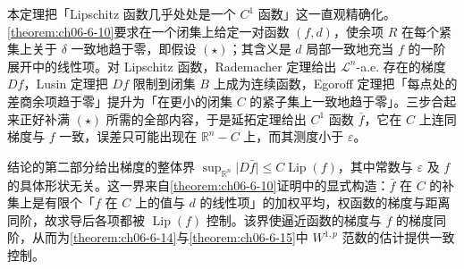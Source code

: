 \documentclass[../../main.tex]{subfiles}%
\begin{document}
\begin{remark}\label{remark:ch06-thm-6-11-动机}
本定理把「Lipschitz 函数几乎处处是一个 $C^1$ 函数」这一直观精确化。\cref{theorem:ch06-6-10}要求在一个闭集上给定一对函数 $(f,d)$，使余项 $R$ 在每个紧集上关于 $\delta$ 一致地趋于零，即假设 $(\star)$；其含义是 $d$ 局部一致地充当 $f$ 的一阶展开中的线性项。对 Lipschitz 函数，Rademacher 定理给出 $\mathcal{L}^n$-a.e. 存在的梯度 $Df$，Lusin 定理把 $Df$ 限制到闭集 $B$ 上成为连续函数，Egoroff 定理把「每点处的差商余项趋于零」提升为「在更小的闭集 $C$ 的紧子集上一致地趋于零」。三步合起来正好补满 $(\star)$ 所需的全部内容，于是延拓定理给出 $C^1$ 函数 $\bar f$，它在 $C$ 上连同梯度与 $f$ 一致，误差只可能出现在 $\mathbb{R}^n-C$ 上，而其测度小于 $\varepsilon$。%

结论的第二部分给出梯度的整体界 $\sup_{\mathbb{R}^n}\lvert D\bar f\rvert\le C\operatorname{Lip}(f)$，其中常数与 $\varepsilon$ 及 $f$ 的具体形状无关。这一界来自\cref{theorem:ch06-6-10}证明中的显式构造：$\bar f$ 在 $C$ 的补集上是有限个「$f$ 在 $C$ 上的值与 $d$ 的线性项」的加权平均，权函数的梯度与距离同阶，故求导后各项都被 $\operatorname{Lip}(f)$ 控制。该界使逼近函数的梯度与 $f$ 的梯度同阶，从而为\cref{theorem:ch06-6-14}与\cref{theorem:ch06-6-15}中 $W^{1,p}$ 范数的估计提供一致控制。%
\end{remark}
\end{document}
